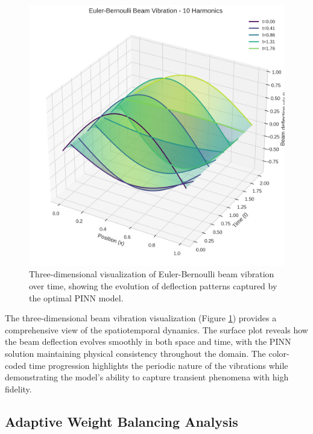 \begin{figure}[ht]
    \centering
    \includegraphics[width = 1.0\linewidth]{figures/euler_bernoulli_3d_10h.png}
    \caption{Three-dimensional visualization of Euler-Bernoulli beam vibration over time, showing the evolution of deflection patterns captured by the optimal PINN model.}
    \label{fig:beam_3d}
\end{figure}

The three-dimensional beam vibration visualization (Figure \ref{fig:beam_3d}) provides a comprehensive view of the spatiotemporal dynamics. The surface plot reveals how the beam deflection evolves smoothly in both space and time, with the PINN solution maintaining physical consistency throughout the domain. The color-coded time progression highlights the periodic nature of the vibrations while demonstrating the model's ability to capture transient phenomena with high fidelity.

\subsection{Adaptive Weight Balancing Analysis}

